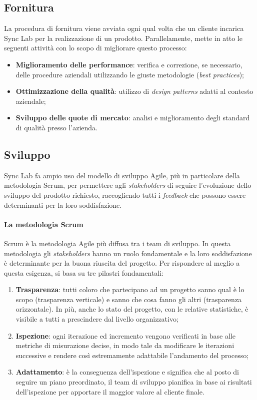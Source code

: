 \subsection{Fornitura}
La procedura di fornitura viene avviata ogni qual volta che un cliente incarica Sync Lab per la realizzazione di un prodotto. Parallelamente, mette in atto le seguenti attività con lo scopo di migliorare questo processo:
\begin{itemize}
  \item \textbf{Miglioramento delle performance}: verifica e correzione, se necessario, delle procedure aziendali utilizzando le giuste metodologie (\emph{best practices});
  \item \textbf{Ottimizzazione della qualità}: utilizzo di \emph{design patterns} adatti al contesto aziendale;
  \item \textbf{Sviluppo delle quote di mercato}: analisi e miglioramento degli standard di qualità presso l'azienda.
\end{itemize} 

\subsection{Sviluppo}
Sync Lab fa ampio uso del modello di sviluppo Agile, più in particolare della metodologia Scrum, per permettere agli \emph{stakeholders} di seguire l'evoluzione dello sviluppo del prodotto richiesto, raccogliendo tutti i \emph{feedback} che possono essere determinanti per la loro soddisfazione. 

\paragraph{La metodologia Scrum}
Scrum è la metodologia Agile più diffusa tra i team di sviluppo. In questa metodologia gli \emph{stakeholders} hanno un ruolo fondamentale e la loro soddisfazione è determinante per la buona riuscita del progetto. Per rispondere al meglio a questa esigenza, si basa su tre pilastri fondamentali:
\begin{enumerate}
  \item \textbf{Trasparenza}: tutti coloro che partecipano ad un progetto sanno qual è lo scopo (trasparenza verticale) e sanno che cosa fanno gli altri (trasparenza orizzontale). In più, anche lo stato del progetto, con le relative statistiche, è visibile a tutti a prescindere dal livello organizzativo;
  \item \textbf{Ispezione}: ogni iterazione ed incremento vengono verificati in base alle metriche di misurazione decise, in modo tale da modificare le iterazioni successive e rendere così estremamente adattabile l'andamento del processo;
  \item \textbf{Adattamento}: è la conseguenza dell'ispezione e significa che al posto di seguire un piano preordinato, il team di sviluppo pianifica in base ai risultati dell'ispezione per apportare il maggior valore al cliente finale.
\end{enumerate}

